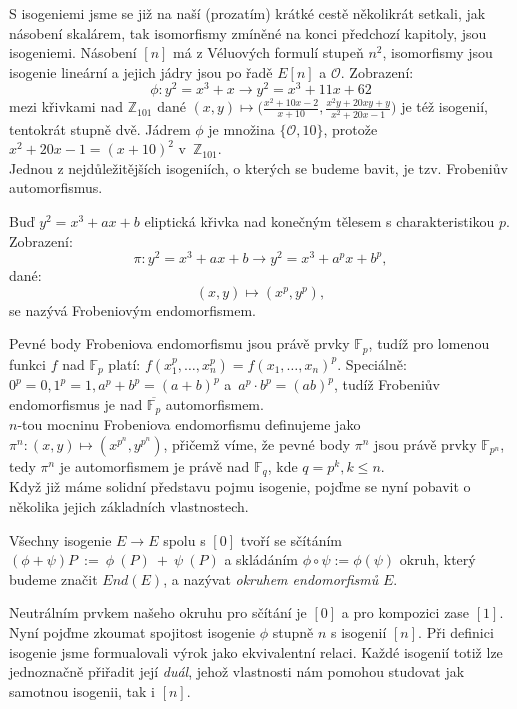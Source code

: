 \documentclass [12pt]{report}
\begin{document}
S isogeniemi jsme se již na naší (prozatím) krátké cestě několikrát setkali, jak násobení skalárem, tak isomorfismy zmíněné na konci předchozí kapitoly, jsou isogeniemi. Násobení $[n]$ má z Véluových formulí stupeň $n^2$, isomorfismy jsou isogenie lineární a jejich jádry jsou po řadě $E[n]$ a $\mathcal{O}$. Zobrazení:
\begin{equation*}
\phi : y^2 = x^3+x \longrightarrow y^2 =  x^3 + 11x + 62
\end{equation*}
mezi křivkami nad $\mathbb{Z}_{101}$ dané $(x,y) \mapsto \Big(\frac{x^2 + 10x - 2}{x+10},\frac{x^2 y + 20xy + y}{x^2 + 20x - 1}\Big)$ je též isogenií, tentokrát stupně dvě. Jádrem $\phi$ je množina $\lbrace \mathcal{O},10 \rbrace$, protože $x^2 + 20x - 1 = (x+10)^2$ v~$\mathbb{Z}_{101}$.\\

Jednou z nejdůležitějších isogeniích, o kterých se budeme bavit, je tzv. Frobeniův automorfismus.
\begin{definice}
Buď $y^2 = x^3+ax+b$ eliptická křivka nad konečným tělesem s charakteristikou $p$. Zobrazení:
\begin{equation*}
\pi : y^2 = x^3+ax+b \longrightarrow y^2 = x^3 + a^p x + b^p,
\end{equation*}
dané:
\begin{equation*}
(x,y) \mapsto (x^p,y^p),
\end{equation*}
se nazývá Frobeniovým endomorfismem.
\end{definice}

Pevné body Frobeniova endomorfismu jsou právě prvky $\mathbb{F}_p$, tudíž pro lomenou funkci $f$ nad $\mathbb{F}_p$ platí: $f(x_1^p,\dots,x_n^p)=f(x_1,\dots,x_n)^p$. Speciálně: $0^p = 0, 1^p = 1, a^p + b^p = (a+b)^p$ a~$a^p \cdot b^p = (ab)^p$, tudíž Frobeniův endomorfismus je nad $\overline{\mathbb{F}_p}$ automorfismem.\\

$n$-tou mocninu Frobeniova endomorfismu definujeme jako $\pi^n : (x,y) \mapsto (x^{p^n},y^{p^n})$, přičemž víme, že pevné body $\pi^n$ jsou právě prvky $\mathbb{F}_{p^n}$, tedy $\pi^n$ je automorfismem je právě nad $\mathbb{F}_{q}$, kde $ q = p^k, k \leqslant n$.\\

Když již máme solidní představu pojmu isogenie, pojďme se nyní pobavit o několika jejich základních vlastnostech.

\begin{veta}
Všechny isogenie $E \longrightarrow E$ spolu s $[0]$ tvoří se sčítáním $(\phi + \psi)P~:=~\phi~(P)~+~\psi~(P)$ a skládáním $\phi \circ \psi  := \phi(\psi)$ okruh, který budeme značit $End(E)$, a nazývat \textit{okruhem endomorfismů } $E$. 
\end{veta}
Neutrálním prvkem našeho okruhu pro sčítání je $[0]$ a pro kompozici zase $[1]$. Nyní pojďme zkoumat spojitost isogenie $\phi $ stupně $n$ s isogenií $[n]$. Při definici isogenie jsme formualovali výrok  jako ekvivalentní relaci. Každé isogenií totiž lze jednoznačně přiřadit její \textit{duál}, jehož vlastnosti nám pomohou studovat jak samotnou isogenii, tak i $[n]$.
\end{document}
